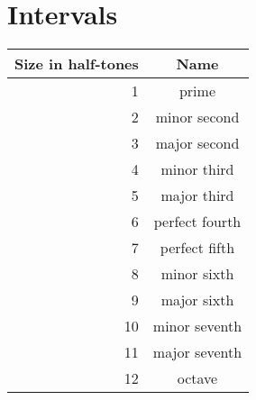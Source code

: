\section{Intervals}
\begin{tabular}{ r|c|}
	Size in half-tones & Name \\
	\hline
	1 & prime \\
	2 & minor second \\
	3 & major second \\
	4 & minor third \\
	5 & major third \\
	6 & perfect fourth \\
	7 & perfect fifth \\
	8 & minor sixth \\
	9 & major sixth \\
	10 & minor seventh \\
	11 & major seventh \\
	12 & octave
\end{tabular}